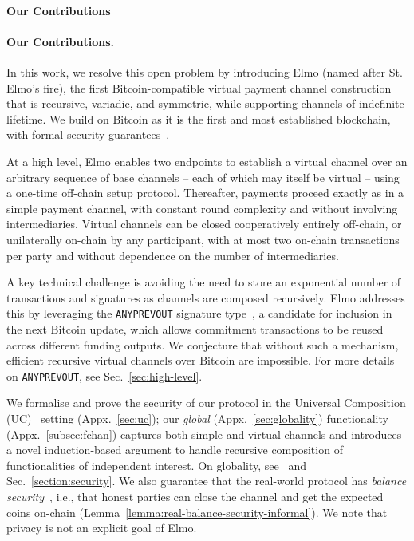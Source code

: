 \makeatletter%
%
  {\paragraph{Our Contributions}}%
  {\paragraph{Our Contributions.}}%
\makeatother%
In this work, we resolve this open problem by introducing Elmo (named after St.
Elmo's fire), the first Bitcoin-compatible virtual payment channel construction
that is recursive, variadic, and symmetric, while supporting channels of
indefinite lifetime. We build on Bitcoin as it is the first and most established
blockchain, with formal security guarantees~\cite{DBLP:conf/crypto/GarayKL17}.

At a high level, Elmo enables two endpoints to establish a virtual channel over
an arbitrary sequence of base channels -- each of which may itself be virtual --
using a one-time off-chain setup protocol. Thereafter, payments proceed exactly
as in a simple payment channel, with constant round complexity and without
involving intermediaries. Virtual channels can be closed cooperatively entirely
off-chain, or unilaterally on-chain by any participant, with at most two
on-chain transactions per party and without dependence on the number of
intermediaries.

A key technical challenge is avoiding the need to store an exponential number of
transactions and signatures as channels are composed
recursively. Elmo addresses this by leveraging the \texttt{ANYPREVOUT} signature
type~\cite{anyprevout}, a candidate for inclusion in the next Bitcoin update,
which allows commitment transactions to be reused across different funding
outputs. We conjecture that without such a mechanism, efficient recursive virtual
channels over Bitcoin are impossible. For more details on \texttt{ANYPREVOUT},
see Sec.~\ref{sec:high-level}.

  We formalise and prove the security of our protocol in the Universal
  Composition (UC)~\cite{uc} setting
  (Appx.~\ref{sec:uc});
  our \emph{global}
  (Appx.~\ref{sec:globality})
  functionality
  (Appx.~\ref{subsec:fchan})
  captures
  both simple and virtual channels and introduces a novel induction-based
  argument to handle recursive composition of functionalities of independent
  interest. On globality,
  see~\cite{DBLP:conf/tcc/BadertscherCHTZ20} and
  Sec.~\ref{section:security}. We also guarantee that the real-world protocol
  has \emph{balance security}~\cite{why3ln}, i.e., that honest parties can close
  the channel and get the expected coins on-chain
  (Lemma~\ref{lemma:real-balance-security-informal}). We note that privacy is
  not an explicit goal of Elmo.

